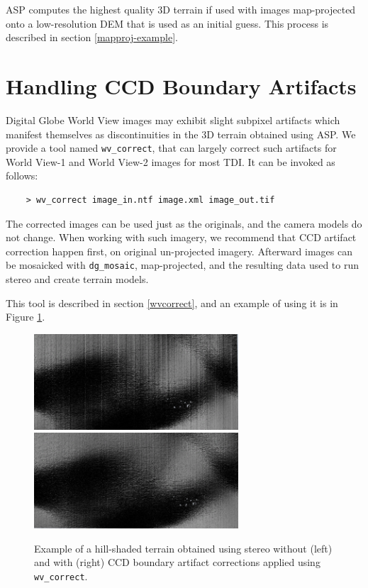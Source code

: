 ASP computes the highest quality 3D terrain if used with images map-projected
onto a low-resolution DEM that is used as an initial guess. This process
is described in section \ref{mapproj-example}.

\section{Handling CCD Boundary Artifacts}
\label{wvcorrect-example}

Digital Globe World View images \cite{digital-globe:camera} may exhibit
slight subpixel artifacts which manifest themselves as discontinuities
in the 3D terrain obtained using ASP. We provide a tool named
\texttt{wv\_correct}, that can largely correct such artifacts for World
View-1 and World View-2 images for most TDI. It can be invoked as
follows:

\begin{verbatim}
    > wv_correct image_in.ntf image.xml image_out.tif
\end{verbatim}

The corrected images can be used just as the originals, and the camera
models do not change. When working with such imagery, we recommend that
CCD artifact correction happen first, on original un-projected
imagery. Afterward images can be mosaicked with \texttt{dg\_mosaic},
map-projected, and the resulting data used to run stereo and create
terrain models.

This tool is described in section \ref{wvcorrect}, and an example of
using it is in Figure \ref{fig:ccd-artifact-example}.

\begin{figure}[h!]
\centering
  \includegraphics[width=3.0in]{images/examples/ccd_before_600px.png}
  \includegraphics[width=3.0in]{images/examples/ccd_after_600px.png}
\caption{Example of a hill-shaded terrain obtained using stereo without (left) and with (right) CCD boundary artifact corrections applied using \texttt{wv\_correct}.}
\label{fig:ccd-artifact-example}
\end{figure}

